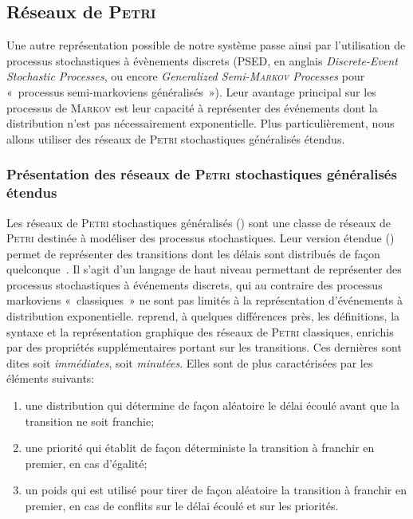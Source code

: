     \subsection{Réseaux de \textsc{Petri}}
Une autre représentation possible de notre système passe ainsi par l'utilisation de processus stochastiques à évènements discrets (PSED, en anglais \textit{Discrete-Event Stochastic Processes}, ou encore \textit{Generalized Semi-\textsc{Markov} Processes} pour « processus semi-markoviens généralisés »).
Leur avantage principal sur les processus de \textsc{Markov} est leur capacité à représenter des événements dont la distribution n'est pas nécessairement exponentielle.
Plus particulièrement, nous allons utiliser des réseaux de \textsc{Petri} stochastiques généralisés étendus.

        \subsubsection{Présentation des réseaux de \textsc{Petri} stochastiques généralisés étendus}
\label{sa:subsubsec:presRPSGe}
Les réseaux de \textsc{Petri} stochastiques généralisés (\rpsg) sont une classe de réseaux de \textsc{Petri} destinée à modéliser des processus stochastiques.
Leur version étendue (\rpsge) permet de représenter des transitions dont les délais sont distribués de façon quelconque~\cite{ABCDF95}.
Il s'agit d'un langage de haut niveau permettant de représenter des processus stochastiques à événements discrets, qui au contraire des processus markoviens «~classiques~» ne sont pas limités à la représentation d'événements à distribution exponentielle.
\rpsge reprend, à quelques différences près, les définitions, la syntaxe et la représentation graphique des réseaux de \textsc{Petri} classiques, enrichis par des propriétés supplémentaires portant sur les transitions.
Ces dernières sont dites soit \textit{immédiates}, soit \textit{minutées}.
Elles sont de plus caractérisées par les éléments suivants:
\begin{enumerate}
    \item une distribution qui détermine de façon aléatoire le délai écoulé avant que la transition ne soit franchie;
    \item une priorité qui établit de façon déterministe la transition à franchir en premier, en cas d'égalité;
    \item un poids qui est utilisé pour tirer de façon aléatoire la transition à franchir en premier, en cas de conflits sur le délai écoulé et sur les priorités.
\end{enumerate}

